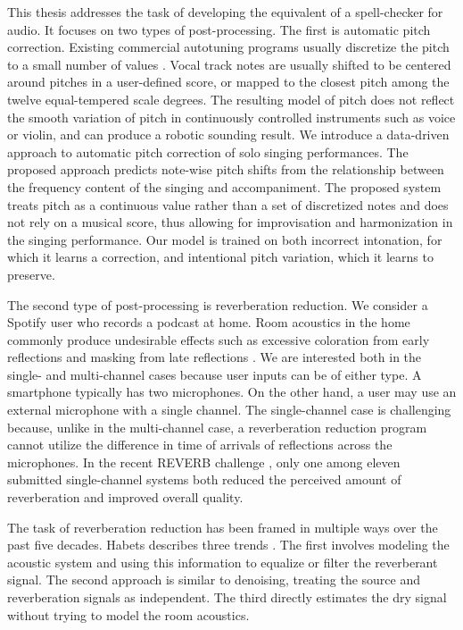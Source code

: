 This thesis addresses the task of developing the equivalent of a spell-checker for audio. It focuses on two types of post-processing. The first is automatic pitch correction. Existing commercial autotuning programs usually discretize the pitch to a small number of values \cite{antares:2016}. Vocal track notes are usually shifted to be centered around pitches in a user-defined score, or mapped to the closest pitch among the twelve equal-tempered scale degrees. The resulting model of pitch does not reflect the smooth variation of pitch in continuously controlled instruments such as voice or violin, and can produce a robotic sounding result. We introduce a data-driven approach to automatic pitch correction of solo singing performances. The proposed approach predicts note-wise pitch shifts from the relationship between the frequency content of the singing and accompaniment. The proposed system treats pitch as a continuous value rather than a set of discretized notes and does not rely on a musical score, thus allowing for improvisation and harmonization in the singing performance. Our model is trained on both incorrect intonation, for which it learns a correction, and intentional pitch variation, which it learns to preserve.

The second type of post-processing is reverberation reduction. We consider a Spotify user who records a podcast at home. Room acoustics in the home commonly produce undesirable effects such as excessive coloration from early reflections and masking from late reflections \cite{faller2019modifying}. We are interested both in the single- and multi-channel cases because user inputs can be of either type. A smartphone typically has two microphones. On the other hand, a user may use an external microphone with a single channel. The single-channel case is challenging because, unlike in the multi-channel case, a reverberation reduction program cannot utilize the difference in time of arrivals of reflections across the microphones. In the recent REVERB challenge \cite{kinoshita2016summary}, only one among eleven submitted single-channel systems both reduced the perceived amount of reverberation and improved overall quality.

The task of reverberation reduction has been framed in multiple ways over the past five decades. Habets describes three trends \cite{habets2016fifty}. The first involves modeling the acoustic system and using this information to equalize or filter the reverberant signal. The second approach is similar to denoising, treating the source and reverberation signals as independent. The third directly estimates the dry signal without trying to model the room acoustics.


